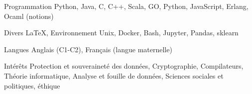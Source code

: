 


\begin{cvskills}


\cvskill
{Programmation} %
{Python, Java, C, C++, Scala, GO, Python, JavaScript, Erlang, Ocaml (notions)} %


\cvskill
{Divers} %
{\LaTeX, Environnement Unix, Docker, Bash, Jupyter, Pandas, sklearn} %


\cvskill
{Langues} %
{Anglais (C1-C2), Français (langue maternelle)} %


\cvskill
{Intérêts} %
{Protection et souveraineté des données, Cryptographie, Compilateurs, Théorie informatique, Analyse et fouille de données, Sciences sociales et politiques, éthique} %


\end{cvskills}
